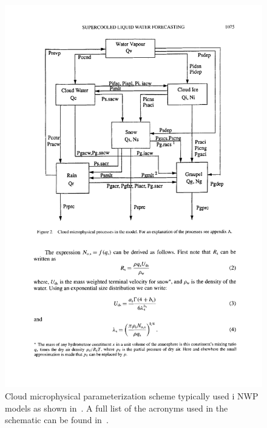 \begin{figure}
\centering
\includegraphics[scale=0.8]{microphysics.pdf}
\caption{Cloud microphysical parameterization scheme typically used i NWP models as shown in~\cite{Reisner1998}. A full list of the acronyms used in the schematic can be found in~\cite{Reisner1998}.}
\label{fig:microphysics}
\end{figure}

